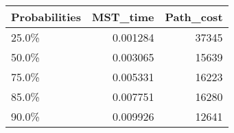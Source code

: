 \begin{tabular}{lrr}
\toprule
Probabilities &  MST\_time &  Path\_cost \\
\midrule
        25.0\% &  0.001284 &      37345 \\
        50.0\% &  0.003065 &      15639 \\
        75.0\% &  0.005331 &      16223 \\
        85.0\% &  0.007751 &      16280 \\
        90.0\% &  0.009926 &      12641 \\
\bottomrule
\end{tabular}
